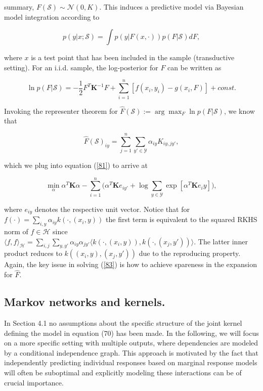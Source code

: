 \documentclass[leqno, a4paper,12pt]{article}
\begin{document}
\noindent summary, $F(\mathcal{S}) \sim \mathcal{N}(0,K)$. This induces a predictive model via Bayesian model integration according to

\begin{equation}
\label{80}
p(y|x;\mathcal{S}) = \int p(y|F(x,\cdot))p(F|\mathcal{S})dF,
\end{equation}

\noindent where $x$ is a test point that has been included in the sample (transductive setting).
For an i.i.d. sample, the log-posterior for $F$ can be written as

\begin{equation}
\label{81}
\ln p(F|\mathcal{S}) = - \frac{1}{2}F^T \boldsymbol{K}^{-1} F + \sum_{i=1}^{n}[f(x_i,y_i)-g(x_i,F)] + const.
\end{equation}

\noindent Invoking the representer theorem for $\hat{F}(\mathcal{S}) := \arg\max _F\ln p(F|\mathcal{S})$, we know
that

\begin{equation}
\label{82}
\hat{F}(\mathcal{S})_{iy} = \sum_{j=1}^{n}\sum_{y'\in \mathcal{Y}} \alpha_{iy} K_{iy,jy'},
\end{equation}

\noindent which we plug into equation (\ref{81}) to arrive at

\begin{equation}
\label{83}
\min\limits_\alpha \alpha^T \boldsymbol{K}\alpha - \sum_{i=1}^{n}\bigg(\alpha^T \boldsymbol{K}e_{iy'}+\log \sum_{y \in \mathcal{Y}} \exp[\alpha^T \boldsymbol{K}e_iy]\bigg),
\end{equation}

\noindent where $e_{iy}$ denotes the respective unit vector. Notice that for
$ f(\cdot) = \sum_{i,y} \alpha_{iy} k(\cdot,(x_i,y)) $
the first term is equivalent to the squared RKHS norm of $f \in \mathcal{H} $ since \\
$ \langle f,f \rangle _\mathcal{H} = \sum_{i,j} \sum_{y,y'} \alpha_{iy} \alpha_{jy'} \langle k(\cdot,(x_i,y)),k(\cdot,(x_j,y'))\rangle $.
The latter inner product reduces to $ k((x_i,y),(x_j,y')) $
due to the reproducing property. Again, the
key issue in solving (\ref{83}) is how to achieve spareness in the expansion for $\hat{F}$.

\subsection{Markov networks and kernels.} In Section 4.1 no assumptions about
the specific structure of the joint kernel defining the model in equation
(70) has been made. In the following, we will focus on a more specific
setting with multiple outputs, where dependencies are modeled by a
conditional independence graph. This approach is motivated by the fact
that independently predicting individual responses based on marginal
response models will often be suboptimal and explicitly modeling these
interactions can be of crucial importance.
\end{document}
